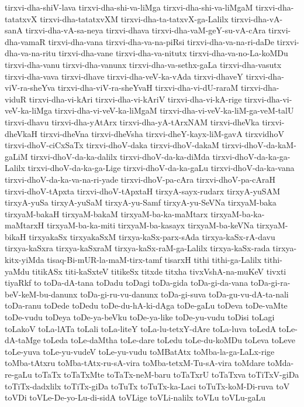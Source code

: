 {tirxvi-dha-shiV-lava
tirxvi-dha-shi-va-liMga
tirxvi-dha-shi-va-liMgaM
tirxvi-dha-tatatxvX
tirxvi-dha-tatatxvXM
tirxvi-dha-ta-tatxvX-ga-Lalilx
tirxvi-dha-vA-sanA
tirxvi-dha-vA-sa-neya
tirxvi-dhava
tirxvi-dha-vaM-geY-su-vA-cAra
tirxvi-dha-vamaR
tirxvi-dha-vana
tirxvi-dha-va-na-piRsi
tirxvi-dha-va-na-ri-daDe
tirxvi-dha-va-na-ritu
tirxvi-dha-vane
tirxvi-dha-va-nitutx
tirxvi-dha-va-no-La-koMDu
tirxvi-dha-vanu
tirxvi-dha-vanunx
tirxvi-dha-va-sethx-gaLa
tirxvi-dha-vasutx
tirxvi-dha-vava
tirxvi-dhave
tirxvi-dha-veV-ka-vAda
tirxvi-dhaveY
tirxvi-dha-viV-ra-sheYva
tirxvi-dha-viV-ra-sheYvaH
tirxvi-dha-vi-dU-raraM
tirxvi-dha-viduR
tirxvi-dha-vi-kAri
tirxvi-dha-vi-kAriV
tirxvi-dha-vi-kA-rige
tirxvi-dha-vi-veV-ka-liMga
tirxvi-dha-vi-veV-ka-liMgaM
tirxvi-dha-vi-veV-ka-liM-ga-veM-talU
tirxvi-dhavu
tirxvi-dha-yAtArx
tirxvi-dha-yA-tArxNAM
tirxvi-dheVka
tirxvi-dheVkaH
tirxvi-dheVna
tirxvi-dheVsha
tirxvi-dheY-kayx-liM-gavA
tirxvidhoV
tirxvi-dhoV-ciCxSaTx
tirxvi-dhoV-daka
tirxvi-dhoV-dakaM
tirxvi-dhoV-da-kaM-gaLiM
tirxvi-dhoV-da-ka-dalilx
tirxvi-dhoV-da-ka-diMda
tirxvi-dhoV-da-ka-ga-Lalilx
tirxvi-dhoV-da-ka-ga-Lige
tirxvi-dhoV-da-ka-gaLu
tirxvi-dhoV-da-ka-vana
tirxvi-dhoV-da-ka-va-na-ri-yade
tirxvi-dhoV-pa-cAra
tirxvi-dhoV-pa-cAraH
tirxvi-dhoV-tApxta
tirxvi-dhoV-tApxtaH
tirxyA-sayx-rudarx
tirxyA-yuSAM
tirxyA-yuSa
tirxyA-yuSaM
tirxyA-yu-Samf
tirxyA-yu-SeVNa
tirxyaM-baka
tirxyaM-bakaH
tirxyaM-bakaM
tirxyaM-ba-ka-maMtarx
tirxyaM-ba-ka-maMtarxH
tirxyaM-ba-ka-miti
tirxyaM-ba-kasayx
tirxyaM-ba-keVNa
tirxyaM-bikaH
tirxyakaSx
tirxyakaSxM
tirxya-kaSx-parx-sAda
tirxya-kaSx-rA-davu
tirxya-kaSxra
tirxya-kaSxraM
tirxya-kaSx-raM-ga-Lalilx
tirxya-kaSx-rada
tirxya-kitx-yiMda
tisaq-Bi-mUR-la-maM-tirx-tamf
tisarxH
tithi
tithi-ga-Lalilx
tithi-yaMdu
titikASx
titi-kaSxteV
titikeSx
titxde
titxha
tivxVshA-na-muKeV
tivxti
tiyaRkf
to
toDa-dA-tana
toDadu
toDagi
toDa-gida
toDa-gi-da-vana
toDa-gi-ra-beV-keM-bu-danunx
toDa-gi-ru-vu-danunx
toDa-gi-suva
toDa-gu-vu-dA-ta-nali
toDa-ranu
toDede
toDedu
toDe-du-hA-ki-dAga
toDe-gaLu
toDeva
toDe-vaMte
toDe-vudu
toDeya
toDe-ya-beVku
toDe-ya-like
toDe-yu-vudu
toDisi
toLagi
toLakoV
toLa-lATa
toLali
toLa-liteY
toLa-lu-tetxY-dAre
toLa-luva
toLedA
toLe-dA-taMge
toLeda
toLe-daMtha
toLe-dare
toLedu
toLe-du-koMDu
toLeva
toLeve
toLe-yuva
toLe-yu-vudeV
toLe-yu-vudu
toMBatAtx
toMba-la-ga-LaLx-rige
toMba-tAtxru
toMba-tAtx-ru-sA-vira
toMba-tetxM-Tu-sA-vira
toMdare
toMda-re-gaLu
toTaTx
toTaTxMte
toTaTx-neM-baru
toTaTxrU
toTaTxva
toTiTxV-giDa
toTiTx-dadxlilx
toTiTx-giDa
toTuTx
toTuTx-ka-Laci
toTuTx-koM-Di-ruva
toV
toVDi
toVLe-De-yo-Lu-di-sidA
toVLige
toVLi-nalilx
toVLu
toVLu-gaLu
}
